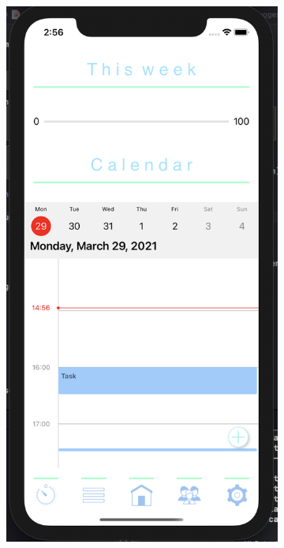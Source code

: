 \begin{figure}[H]
    \centering
    \begin{subfigure}[b]{0.3\textwidth}
        \centering
        \includegraphics[width=\textwidth]{./graphics/Implementation/Dashboard/calendar this week populated.png}

\end{subfigure}
\end{figure}

